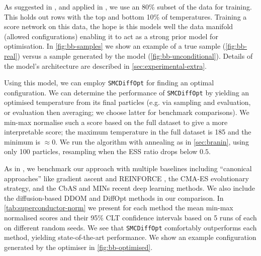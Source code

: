As suggested in \textcite{trabuccoDesignBenchBenchmarksDataDriven2022}, and applied in
\textcite{kongDiffusionModelsConstrained2024,krishnamoorthyDiffusionModelsBlackBox2023},
we use an 80\% subset of the data for training. This holds out rows with the top and bottom 10\% of
temperatures. Training a score network on this data, the hope is this models well the data manifold
(allowed configurations) enabling it to act as a strong prior model for optimisation. In
\autoref{fig:bb-samples} we show an example of a true sample (\autoref{fig:bb-real}) versus a sample
generated by the model (\autoref{fig:bb-unconditional}). Details of the model's architecture are
described in \autoref{sec:experimental-extra}.

Using this model, we can employ \texttt{SMCDiffOpt} for finding an optimal configuration. We can
determine the performance of \texttt{SMCDiffOpt} by yielding an optimised temperature from its final
particles (e.g. via sampling and evaluation, or evaluation then averaging; we choose latter for
benchmark comparisons). We min-max normalise such a score based on the full dataset to give a more
interpretable score; the maximum temperature in the full dataset is 185 and the minimum is
$\approx 0$. We run the algorithm with annealing as in \autoref{sec:branin}, using only 100 particles,
resampling when the ESS ratio drops below $0.5$.

As in \textcite{krishnamoorthyDiffusionModelsBlackBox2023}, we benchmark our approach with multiple
baselines including ``canonical approaches'' like gradient ascent and REINFORCE
\parencite{NIPS1999_464d828b}, the CMA-ES \parencite{Hansen2006} evolutionary strategy, and the CbAS
\parencite{pmlr-v97-brookes19a} and MINs \parencite{NEURIPS2020_373e4c5d} recent deep learning
methods. We also include the diffusion-based DDOM
\parencite{krishnamoorthyDiffusionModelsBlackBox2023} and DiffOpt
\parencite{kongDiffusionModelsConstrained2024} methods in our comparison. In
\autoref{tab:superconductor-norm} we present for each method the mean min-max normalised scores and
their 95\% CLT confidence intervals based on 5 runs of each on different random seeds. We see that
\texttt{SMCDiffOpt} comfortably outperforms each method, yielding state-of-the-art performance. We
show an example configuration generated by the optimiser in \autoref{fig:bb-optimised}.

\begin{table}[t]
    \centering
    \caption{Normalised scores for SuperConductor experiment (higher values are better).}
    \label{tab:superconductor-norm}
\end{table}


